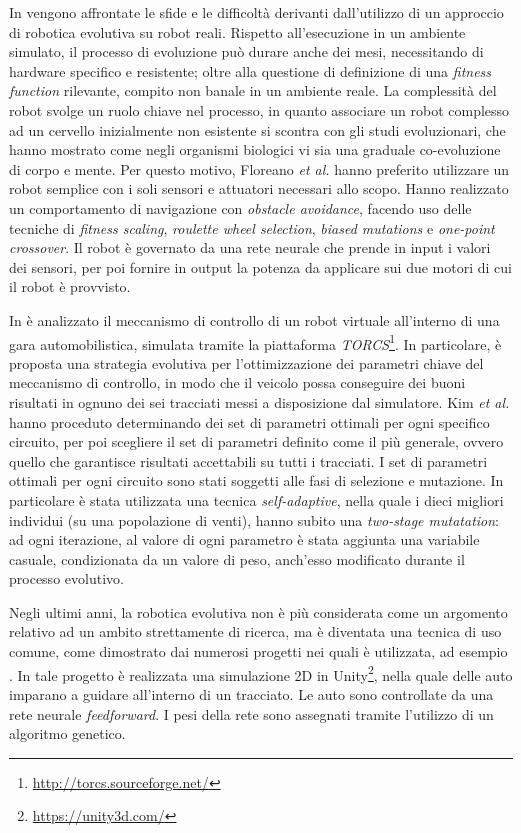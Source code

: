 \documentclass[a4paper,12pt]{article}
\begin{document}
In \cite{PhysicalRobotEvolution} vengono affrontate le sfide e le difficoltà derivanti dall'utilizzo di un approccio di robotica evolutiva su robot reali. Rispetto all'esecuzione in un ambiente simulato, il processo di evoluzione può durare anche dei mesi, necessitando di hardware specifico e resistente; oltre alla questione di definizione di una \emph{fitness function} rilevante, compito non banale in un ambiente reale. La complessità del robot svolge un ruolo chiave nel processo, in quanto associare un robot complesso ad un cervello inizialmente non esistente si scontra con gli studi evoluzionari, che hanno mostrato come negli organismi biologici vi sia una graduale co-evoluzione di corpo e mente. Per questo motivo, Floreano \emph{et al.} hanno preferito utilizzare un robot semplice con i soli sensori e attuatori necessari allo scopo. Hanno realizzato un comportamento di navigazione con \emph{obstacle avoidance}, facendo uso delle tecniche di \emph{fitness scaling}, \emph{roulette wheel selection}, \emph{biased mutations} e \emph{one-point crossover}. Il robot è governato da una rete neurale che prende in input i valori dei sensori, per poi fornire in output la potenza da applicare sui due motori di cui il robot è provvisto.

In \cite{TorcsController} è analizzato il meccanismo di controllo di un robot virtuale all'interno di una gara automobilistica, simulata tramite la piattaforma \emph{TORCS}\footnote{\url{http://torcs.sourceforge.net/}}. In particolare, è proposta una strategia evolutiva per l'ottimizzazione dei parametri chiave del meccanismo di controllo, in modo che il veicolo possa conseguire dei buoni risultati in ognuno dei sei tracciati messi a disposizione dal simulatore. Kim \emph{et al.} hanno proceduto determinando dei set di parametri ottimali per ogni specifico circuito, per poi scegliere il set di parametri definito come il più generale, ovvero quello che garantisce risultati accettabili su tutti i tracciati. I set di parametri ottimali per ogni circuito sono stati soggetti alle fasi di selezione e mutazione. In particolare è stata utilizzata una tecnica \emph{self-adaptive}, nella quale i dieci migliori individui (su una popolazione di venti), hanno subito una \emph{two-stage mutatation}: ad ogni iterazione, al valore di ogni parametro è stata aggiunta una variabile casuale, condizionata da un valore di peso, anch'esso modificato durante il processo evolutivo.

Negli ultimi anni, la robotica evolutiva non è più considerata come un argomento relativo ad un ambito strettamente di ricerca, ma è diventata una tecnica di uso comune, come dimostrato dai numerosi progetti nei quali è utilizzata, ad esempio \cite{arztRepo}. In tale progetto è realizzata una simulazione 2D in Unity\footnote{\url{https://unity3d.com/}}, nella quale delle auto imparano a guidare all'interno di un tracciato. Le auto sono controllate da una rete neurale \emph{feedforward}. I pesi della rete sono assegnati tramite l'utilizzo di un algoritmo genetico.
\end{document}
